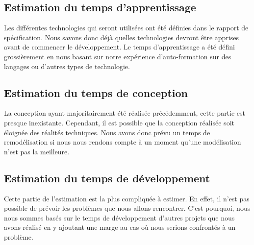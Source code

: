 \subsection{Estimation du temps d'apprentissage}

Les différentes technologies qui seront utilisées ont été définies dans le rapport de spécification. Nous savons donc déjà quelles technologies devront être apprises avant de commencer le développement. Le temps d’apprentissage a été défini grossièrement en nous basant sur notre expérience d’auto-formation sur des langages ou d’autres types de technologie.

\newpage

\subsection{Estimation du temps de conception}

La conception ayant majoritairement été réalisée précédemment, cette partie est presque inexistante. Cependant, il est possible que la conception réalisée soit éloignée des réalités techniques. Nous avons donc prévu un temps de remodélisation si nous nous rendons compte à un moment qu’une modélisation n’est pas la meilleure.

\subsection{Estimation du temps de développement}

Cette partie de l’estimation est la plus compliquée à estimer. En effet, il n’est pas possible de prévoir les problèmes que nous allons rencontrer. C’est pourquoi, nous nous sommes basés sur le temps de développement d’autres projets que nous avons réalisé en y ajoutant une marge au cas où nous serions confrontés à un problème.


